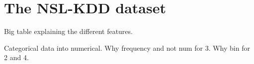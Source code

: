 \section{The NSL-KDD dataset}
Big table explaining the different features.

Categorical data into numerical. Why frequency and not num for 3. Why bin for 2 and 4.